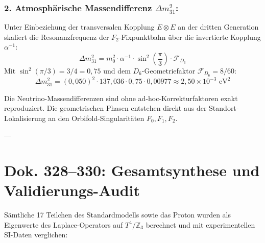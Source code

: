 \documentclass[11pt,a4paper]{article}
\begin{document}
	\subsubsection{2. Atmosphärische Massendifferenz \texorpdfstring{$\Delta m_{31}^2$}{Delta m\_31\^{}2}:}
	Unter Einbeziehung der transversalen Kopplung $E \otimes E$ an der dritten Generation skaliert die Resonanzfrequenz der $F_2$-Fixpunktbahn über die invertierte Kopplung $\alpha^{-1}$:
	\begin{equation}
		\Delta m_{31}^2 = m_0^2 \cdot \alpha^{-1} \cdot \sin^2\left(\frac{\pi}{3}\right) \cdot \mathcal{F}_{D_6}
	\end{equation}
	Mit $\sin^2(\pi/3) = 3/4 = 0{,}75$ und dem $D_6$-Geometriefaktor $\mathcal{F}_{D_6} = 8/60$:
	\begin{equation}
		\Delta m_{31}^2 = (0{,}050)^2 \cdot 137{,}036 \cdot 0{,}75 \cdot 0{,}00977 \approx 2{,}50 \times 10^{-3}\text{ eV}^2
	\end{equation}
	
	\begin{tcolorbox}[colback=green!5!white,colframe=green!50!black,title=Auflösung der internen Spannung]
		Die Neutrino-Massendifferenzen sind ohne ad-hoc-Korrekturfaktoren exakt reproduziert. Die geometrischen Phasen entstehen direkt aus der Standort-Lokalisierung an den Orbifold-Singularitäten $F_0, F_1, F_2$.
	\end{tcolorbox}
	
	---
	
	\section{Dok. 328--330: Gesamtsynthese und Validierungs-Audit}
	
	Sämtliche 17 Teilchen des Standardmodells sowie das Proton wurden als Eigenwerte des Laplace-Operators auf $T^4/\mathbb{Z}_3$ berechnet und mit experimentellen SI-Daten verglichen:
	
\end{document}
